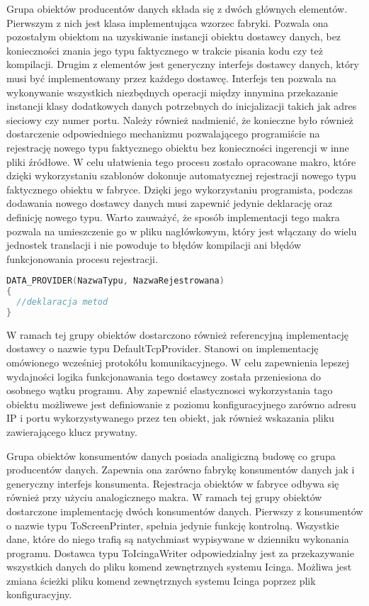 Grupa obiektów producentów danych składa się z dwóch głównych
elementów. Pierwszym z nich jest klasa implementująca wzorzec
fabryki. Pozwala ona pozostałym obiektom na uzyskiwanie instancji
obiektu dostawcy danych, bez konieczności znania jego typu faktycznego
w trakcie pisania kodu czy też kompilacji. Drugim z elementów jest
generyczny interfejs dostawcy danych, który musi być implementowany
przez każdego dostawcę. Interfejs ten pozwala na wykonywanie
wszystkich niezbędnych operacji między innymina przekazanie instancji
klasy dodatkowych danych potrzebnych do inicjalizacji takich jak adres
sieciowy czy numer portu. Należy również nadmienić, że konieczne było
również dostarczenie odpowiedniego mechanizmu pozwalającego
programiście na rejestrację nowego typu faktycznego obiektu bez
konieczności ingerencji w inne pliki źródłowe. W celu ułatwienia tego
procesu zostało opracowane makro, które dzięki wykorzystaniu szablonów
dokonuje automatycznej rejestracji nowego typu faktycznego obiektu w
fabryce. Dzięki jego wykorzystaniu programista, podczas dodawania
nowego dostawcy danych musi zapewnić jedynie deklarację oraz definicję
nowego typu. Warto zauważyć, że sposób implementacji tego makra
pozwala na umieszczenie go w pliku nagłówkowym, który jest włączany do
wielu jednostek translacji i nie powoduje to błędów kompilacji ani
błędów funkcjonowania procesu rejestracji.

\vspace{0.5cm}
\begin{minipage}{\textwidth}
\begin{lstlisting}[language=c++, caption=Definicja dostawcy danych]
DATA_PROVIDER(NazwaTypu, NazwaRejestrowana)
{
  //deklaracja metod
}
\end{lstlisting}
\end{minipage}
\vspace{0.5cm}

W ramach tej grupy obiektów dostarczono również referencyjną
implementację dostawcy o nazwie typu DefaultTcpProvider. Stanowi on
implementację omówionego wcześniej protokółu komunikacyjnego. W celu
zapewnienia lepszej wydajności logika funkcjonawania tego dostawcy
została przeniesiona do osobnego wątku programu. Aby zapewnić
elastycznosci wykorzystania tago obiektu możliwewe jest definiowanie z
poziomu konfiguracyjnego zarówno adresu IP i portu wykorzystywanego
przez ten obiekt, jak również wskazania pliku zawierającego klucz
prywatny.

Grupa obiektów konsumentów danych posiada analigiczną budowę co grupa
producentów danych. Zapewnia ona zarówno fabrykę konsumentów danych
jak i generyczny interfejs konsumenta. Rejestracja obiektów w fabryce
odbywa się również przy użyciu analogicznego makra. W ramach tej grupy
obiektów dostarczone implementację dwóch konsumentów danych. Pierwszy
z konsumentów o nazwie typu ToScreenPrinter, spełnia jedynie funkcję
kontrolną. Wszystkie dane, które do niego trafią są natychmiast
wypisywane w dzienniku wykonania programu. Dostawca typu
ToIcingaWriter odpowiedzialny jest za przekazywanie wszystkich danych
do pliku komend zewnętrznych systemu Icinga. Możliwa jest zmiana
ścieżki pliku komend zewnętrznych systemu Icinga poprzez plik
konfiguracyjny.

